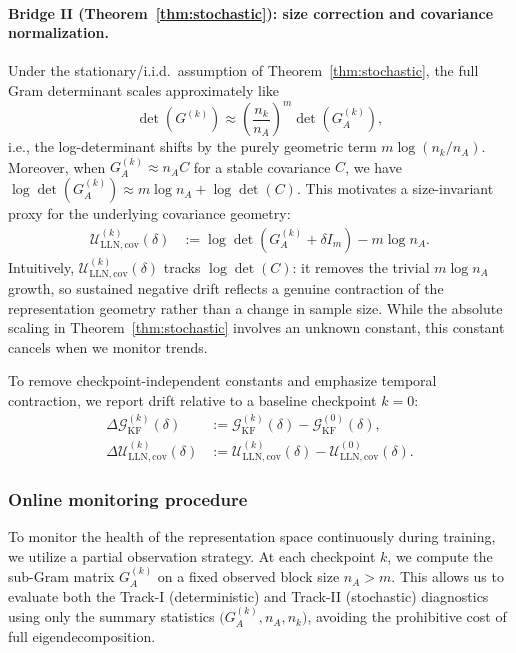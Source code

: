 \documentclass{article}
\theoremstyle{plain}
\theoremstyle{definition}
\theoremstyle{remark}
\begin{document}
\paragraph{Bridge II (Theorem~\ref{thm:stochastic}): size correction and covariance normalization.}
Under the stationary/i.i.d.\ assumption of Theorem~\ref{thm:stochastic}, the full Gram determinant scales
approximately like
\[
\det(G^{(k)})\approx\left(\frac{n_k}{n_A}\right)^m \det(G_A^{(k)}),
\]
i.e., the log-determinant shifts by the purely geometric term $m\log(n_k/n_A)$.
Moreover, when $G_A^{(k)}\approx n_A C$ for a stable covariance $C$, we have
$\log\det(G_A^{(k)})\approx m\log n_A + \log\det(C)$.
This motivates a size-invariant proxy for the underlying covariance geometry:
\begin{align}
\mathcal{U}_{\mathrm{LLN,cov}}^{(k)}(\delta)
&:= \log\det\!\left(G_A^{(k)}+\delta I_m\right) - m\log n_A .
\label{eq:metric_lln_cov}
\end{align}
Intuitively, $\mathcal{U}_{\mathrm{LLN,cov}}^{(k)}(\delta)$ tracks $\log\det(C)$:
it removes the trivial $m\log n_A$ growth, so sustained negative drift reflects a genuine contraction of the
representation geometry rather than a change in sample size. While the absolute scaling in
Theorem~\ref{thm:stochastic} involves an unknown constant, this constant cancels when we monitor trends.


To remove checkpoint-independent constants and emphasize temporal contraction, we report drift relative to
a baseline checkpoint $k=0$:
\begin{align}
\Delta\mathcal{G}_{\mathrm{KF}}^{(k)}(\delta)
&:= \mathcal{G}_{\mathrm{KF}}^{(k)}(\delta)-\mathcal{G}_{\mathrm{KF}}^{(0)}(\delta),\nonumber\\
\Delta\mathcal{U}_{\mathrm{LLN,cov}}^{(k)}(\delta)
&:= \mathcal{U}_{\mathrm{LLN,cov}}^{(k)}(\delta)-\mathcal{U}_{\mathrm{LLN,cov}}^{(0)}(\delta).
\label{eq:diag_deltas}
\end{align}

\subsubsection{Online monitoring procedure}
\label{subsec:method4:monitoring}

To monitor the health of the representation space continuously during training, we utilize a partial observation strategy. At each checkpoint $k$, we compute the sub-Gram matrix $G_A^{(k)}$ on a fixed observed block size $n_A>m$. This allows us to evaluate both the Track-I (deterministic) and Track-II (stochastic) diagnostics using only the summary statistics $\big(G_A^{(k)},n_A,n_k\big)$, avoiding the prohibitive cost of full eigendecomposition.
\end{document}
